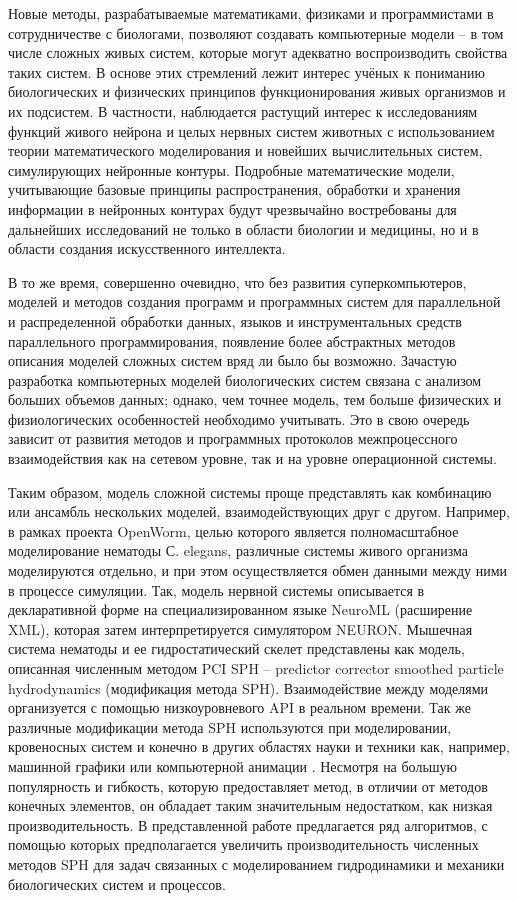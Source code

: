 
{\actuality} Новые методы, разрабатываемые математиками, физиками и программистами в сотрудничестве с биологами, позволяют создавать компьютерные модели -- в том числе сложных живых систем, которые могут адекватно воспроизводить свойства таких систем. В основе этих стремлений лежит интерес учёных к пониманию биологических и физических принципов функционирования живых организмов и их подсистем. В частности, наблюдается растущий интерес к исследованиям функций живого нейрона и целых нервных систем животных с использованием теории математического моделирования и новейших вычислительных систем, симулирующих нейронные контуры. Подробные математические модели, учитывающие базовые принципы распространения, обработки и хранения информации в нейронных контурах будут чрезвычайно востребованы для дальнейших исследований не только в области биологии и медицины, но и в области создания искусственного интеллекта.

В то же время, совершенно очевидно, что без развития суперкомпьютеров, моделей и методов создания программ и программных систем для параллельной и распределенной обработки данных, языков и инструментальных средств параллельного программирования, появление более абстрактных методов описания моделей сложных систем вряд ли было бы возможно. Зачастую разработка компьютерных моделей биологических систем связана с анализом больших объемов данных; однако, чем точнее модель, тем больше физических и физиологических особенностей необходимо учитывать. Это в свою очередь зависит от развития методов и программных протоколов межпроцессного взаимодействия как на сетевом уровне, так и на уровне операционной системы.

Таким образом, модель сложной системы проще представлять как комбинацию или ансамбль нескольких моделей, взаимодействующих друг с другом. Например, в рамках проекта OpenWorm, целью которого является полномасштабное моделирование нематоды  С. elegans, различные системы живого организма моделируются отдельно, и при этом осуществляется обмен данными между ними в процессе симуляции. Так, модель нервной системы описывается в декларативной  форме на специализированном языке  NeuroML (расширение XML), которая затем интерпретируется симулятором  NEURON. Мышечная система нематоды и ее гидростатический скелет представлены как модель, описанная численным методом  PCI SPH -- predictor corrector smoothed particle hydrodynamics (модификация метода SPH). Взаимодействие между моделями организуется с помощью низкоуровневого API в реальном времени. Так же различные модификации метода SPH используются при моделировании, кровеносных систем \cite{Caballero2017} и конечно в других областях науки и техники как, например, машинной графики  или компьютерной анимации \cite{Solenthaler2013}. Несмотря на большую популярность и гибкость, которую предоставляет метод, в отличии от методов конечных элементов, он обладает таким значительным недостатком, как низкая производительность. В представленной работе  предлагается ряд алгоритмов, с помощью которых предполагается увеличить производительность численных методов SPH для задач связанных с моделированием гидродинамики и механики биологических систем и процессов.

